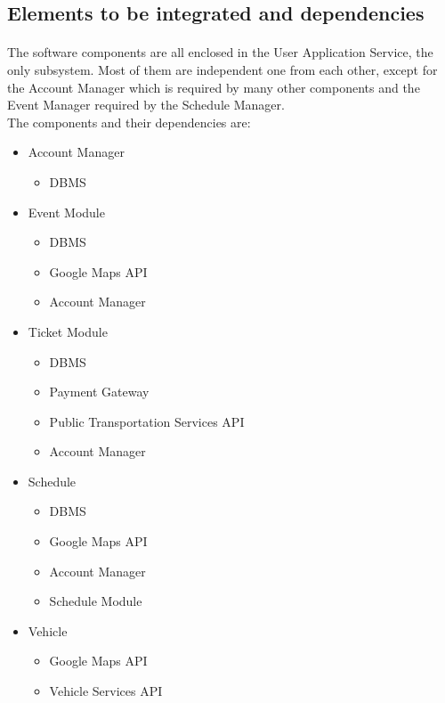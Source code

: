 \documentclass{article}
\begin{document}
		\subsection{Elements to be integrated and dependencies}
		\paragraph{}The software components are all enclosed in the User Application Service, the only subsystem. Most of them are independent one from each other, except for the Account Manager which is required by many other components and the Event Manager required by the Schedule Manager.\\The components and their dependencies are:
		\begin{itemize}
		\item{}Account Manager
			\begin{itemize}
			\item{}DBMS
			\end{itemize}
		\item{} Event Module
			\begin{itemize}
			\item{}DBMS
			\item{}Google Maps API
			\item{}Account Manager
			\end{itemize}
		\item{} Ticket Module
			\begin{itemize}
			\item{}DBMS
			\item{}Payment Gateway
			\item{}Public Transportation Services API
			\item{}Account Manager
			\end{itemize}
		\item{}Schedule
			\begin{itemize}
			\item{}DBMS
			\item{}Google Maps API
			\item{}Account Manager
			\item{}Schedule Module
			\end{itemize}
		\item{}Vehicle
			\begin{itemize}
			\item{}Google Maps API
			\item{}Vehicle Services API
			\end{itemize}
		\end{itemize}
\end{document}
